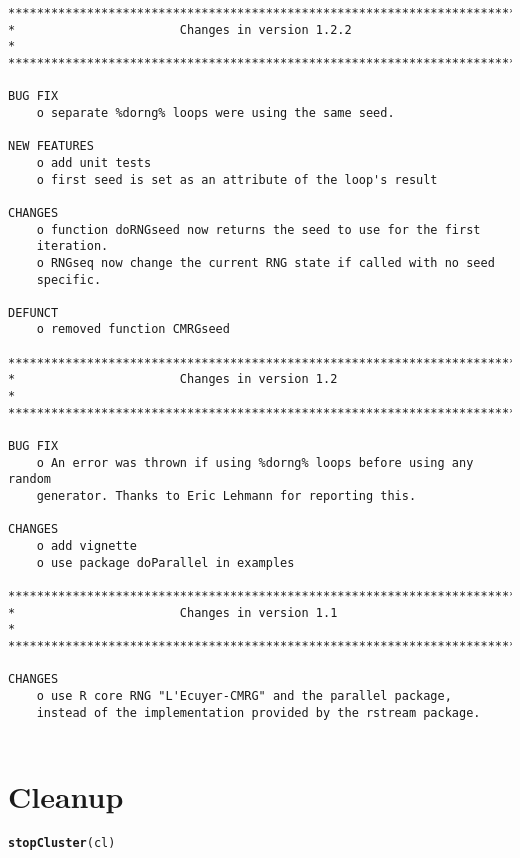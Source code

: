 \documentclass[a4paper,12pt]{article}\usepackage[]{graphicx}\usepackage[]{color}
\makeatletter
\newcommand{\hlstd}[1]{\textcolor[rgb]{0.345,0.345,0.345}{#1}}%
\newcommand{\hlkwd}[1]{\textcolor[rgb]{0.737,0.353,0.396}{\textbf{#1}}}%
\newenvironment{kframe}{%
 \def\at@end@of@kframe{}%
 \ifinner\ifhmode%
  \def\at@end@of@kframe{\end{minipage}}%
  \begin{minipage}{\columnwidth}%
 \fi\fi%
 \def\FrameCommand##1{\hskip\@totalleftmargin \hskip-\fboxsep
 \colorbox{shadecolor}{##1}\hskip-\fboxsep
     \hskip-\linewidth \hskip-\@totalleftmargin \hskip\columnwidth}%
 \MakeFramed {\advance\hsize-\width
   \@totalleftmargin\z@ \linewidth\hsize
   \@setminipage}}%
 {\par\unskip\endMakeFramed%
 \at@end@of@kframe}
\newenvironment{knitrout}{}{} %
\makeatother
\begin{document}
{\begin{verbatim}
*************************************************************************
*                       Changes in version 1.2.2                        *
*************************************************************************

BUG FIX
    o separate %dorng% loops were using the same seed.

NEW FEATURES
    o add unit tests
    o first seed is set as an attribute of the loop's result

CHANGES
    o function doRNGseed now returns the seed to use for the first 
    iteration.
    o RNGseq now change the current RNG state if called with no seed 
    specific.  
    
DEFUNCT
    o removed function CMRGseed

*************************************************************************
*                       Changes in version 1.2                          *
*************************************************************************

BUG FIX
    o An error was thrown if using %dorng% loops before using any random
    generator. Thanks to Eric Lehmann for reporting this.

CHANGES
    o add vignette
    o use package doParallel in examples

*************************************************************************
*                       Changes in version 1.1                          *
*************************************************************************

CHANGES
    o use R core RNG "L'Ecuyer-CMRG" and the parallel package, 
    instead of the implementation provided by the rstream package.


\end{verbatim}
}


\section*{Cleanup}
\begin{knitrout}\footnotesize
{}\color{fgcolor}\begin{kframe}
\begin{alltt}
\hlkwd{stopCluster}\hlstd{(cl)}
\end{alltt}
\end{kframe}
\end{knitrout}
\end{document}
